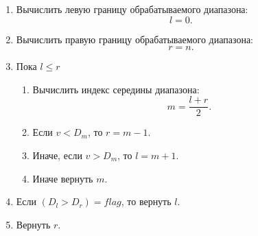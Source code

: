 \begin{enumerate}
	\item Вычислить левую границу обрабатываемого диапазона:
	\begin{equation}
		l = 0.
	\end{equation}
	
	\item Вычислить правую границу обрабатываемого диапазона:
	\begin{equation}
		r = n.
	\end{equation}
	
	\item Пока $l \leq r$
	\begin{enumerate}
		\item Вычислить индекс середины диапазона:
		\begin{equation}
			m = \frac{l + r}{2}.
		\end{equation}
		
		\item Если $v < D_m$, то $r = m - 1$.
		\item Иначе, если $v > D_m$, то $l = m + 1$.
		\item Иначе вернуть $m$.
	\end{enumerate}
	
	\item Если $(D_l > D_r) = flag$, то вернуть $l$.
	\item Вернуть $r$.
\end{enumerate}


\newpage